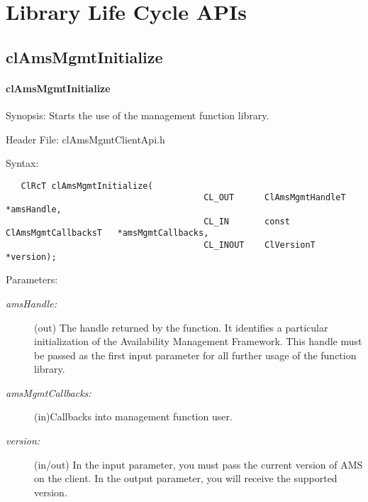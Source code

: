 \newpage
\section{Library Life Cycle APIs}
\subsection{clAmsMgmtInitialize}
\hypertarget{pageams101}{}\paragraph{cl\-Ams\-Mgmt\-Initialize}\label{pageams101}
\begin{Desc}
\item[Synopsis:]Starts the use of the management function library.\end{Desc}
\begin{Desc}
\item[Header File:]clAmsMgmtClientApi.h\end{Desc}
\begin{Desc}
\item[Syntax:]

\footnotesize\begin{verbatim}   ClRcT clAmsMgmtInitialize(
		                               CL_OUT      ClAmsMgmtHandleT            *amsHandle,
		                               CL_IN       const ClAmsMgmtCallbacksT   *amsMgmtCallbacks,
		                               CL_INOUT    ClVersionT                  *version);
\end{verbatim}
\normalsize
\end{Desc}
\begin{Desc}
\item[Parameters:]
\begin{description}
\item[{\em ams\-Handle:}](out) The handle returned by the function. It identifies a particular initialization of the Availability Management Framework.
This handle must be passed as the first input parameter for all further usage of the function library. 
\item[{\em ams\-Mgmt\-Callbacks:}](in)Callbacks into management function user. 
\item[{\em version:}](in/out) In the input parameter, you must pass the current version of AMS on the client. In the output parameter, you will receive the supported version.\end{description}
\end{Desc}
